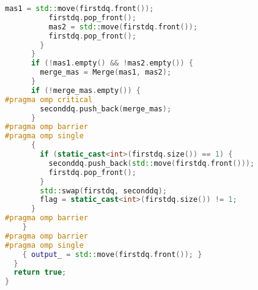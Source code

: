 \documentclass[a4paper,12pt]{article}
\begin{document}
\begin{lstlisting}[language=C++,caption={Фрагмент OpenMP-версии}]
          mas1 = std::move(firstdq.front());
          firstdq.pop_front();
          mas2 = std::move(firstdq.front());
          firstdq.pop_front();
        }
      }
      if (!mas1.empty() && !mas2.empty()) {
        merge_mas = Merge(mas1, mas2);
      }
      if (!merge_mas.empty()) {
#pragma omp critical
        seconddq.push_back(merge_mas);
      }
#pragma omp barrier
#pragma omp single
      {
        if (static_cast<int>(firstdq.size()) == 1) {
          seconddq.push_back(std::move(firstdq.front()));
          firstdq.pop_front();
        }
        std::swap(firstdq, seconddq);
        flag = static_cast<int>(firstdq.size()) != 1;
      }
#pragma omp barrier
    }
#pragma omp barrier
#pragma omp single
    { output_ = std::move(firstdq.front()); }
  }
  return true;
}
\end{lstlisting}
\end{document}
